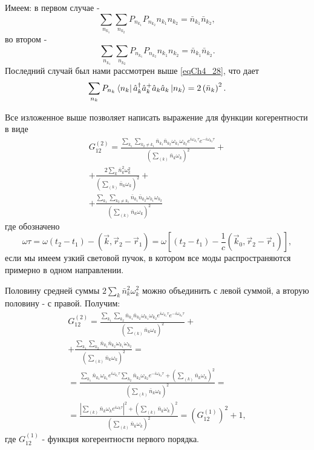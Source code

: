 Имеем: в первом случае -
\begin{equation}
\sum_{n_{k_1}}\sum_{n_{k_2}} P_{n_{k_1}} P_{n_{k_2}} 
n_{k_1} n_{k_2} = \bar{n}_{k_1} \bar{n}_{k_2},
\label{eqCh4_34}
\end{equation}
во втором -
\begin{equation}
\sum_{n_{k_1}}\sum_{n_{k_2}} P_{n_{k_1}} P_{n_{k_2}} 
n_{k_1} n_{k_2} = \bar{n}_{k_1} \bar{n}_{k_2}.
\label{eqCh4_35}
\end{equation}
Последний случай был нами рассмотрен выше \eqref{eqCh4_28}, что дает
\begin{equation}
\sum_{n_{k}} P_{n_{k}}
\bra{n_k}\hat{a}_k^{\dag}\hat{a}_k^{+}\hat{a}_k\hat{a}_k\ket{n_k}
= 2 \left(\bar{n}_k\right)^2.
\label{eqCh4_36}
\end{equation}

Все изложенное выше позволяет написать выражение для функции
когерентности в виде 
\begin{eqnarray}
G_{12}^{(2)} = \frac{\sum_{k_1}\sum_{k_2 \neq k_1} \bar{n}_{k_1}
  \bar{n}_{k_2} \omega_{k_1} \omega_{k_2} e^{i \omega_{k_1} \tau} 
e^{- i \omega_{k_2} \tau} } 
{\left(\sum_{(k)} \bar{n}_k \omega_k\right)^2} + 
\nonumber \\
+
\frac{2 \sum_{k} \bar{n}_{k}^2 \omega_k^2} 
{\left(\sum_{(k)} \bar{n}_k \omega_k\right)^2} + 
\nonumber \\
+
\frac{\sum_{k_1}\sum_{k_2 \neq k_1} \bar{n}_{k_1}
  \bar{n}_{k_2} \omega_{k_1} \omega_{k_2}} 
{\left(\sum_{(k)} \bar{n}_k \omega_k\right)^2}
\label{eqCh4_37}
\end{eqnarray}
где обозначено 
\[
\omega \tau = \omega \left(t_2 - t_1\right) - \left(\vec{k}, \vec{r}_2
- \vec{r}_1\right) = 
\omega \left[
\left(t_2 - t_1\right) - \frac{1}{c}\left(\vec{k}_0, \vec{r}_2
- \vec{r}_1\right)
\right],
\]
если мы имеем узкий световой пучок, в котором все моды
распространяются примерно в одном направлении. 

Половину средней суммы $2 \sum_{k} \bar{n}_{k}^2 \omega_k^2$ можно
объединить с левой суммой, а вторую половину - с правой. Получим: 
\begin{eqnarray}
G_{12}^{(2)} = \frac{\sum_{k_1}\sum_{k_2} \bar{n}_{k_1}
  \bar{n}_{k_2} \omega_{k_1} \omega_{k_2} e^{i \omega_{k_1} \tau} 
e^{- i \omega_{k_2} \tau}} 
{\left(\sum_{(k)} \bar{n}_k \omega_k\right)^2} + 
\nonumber \\
+ \frac{\sum_{k_1}\sum_{k_2} \bar{n}_{k_1}
  \bar{n}_{k_2} \omega_{k_1} \omega_{k_2}} 
{\left(\sum_{(k)} \bar{n}_k \omega_k\right)^2} = 
\nonumber \\
= 
\frac{\sum_{k_1}\bar{n}_{k_1} \omega_{k_1} e^{i \omega_{k_1} \tau}
\sum_{k_2}\bar{n}_{k_2} \omega_{k_2} e^{- i \omega_{k_2} \tau} +
\left(\sum_{(k)} \bar{n}_k \omega_k\right)^2
}
{\left(\sum_{(k)} \bar{n}_k \omega_k\right)^2} = 
\nonumber \\
= \frac{\left|\sum_{(k)}\bar{n}_{k} \omega_{k} e^{i \omega_{k}
  \tau}\right|^2 + \left(\sum_{(k)} \bar{n}_k \omega_k\right)^2}
{\left(\sum_{(k)} \bar{n}_k \omega_k\right)^2} = 
\left(G_{12}^{(1)}\right)^2 + 1,
\label{eqCh4_38}
\end{eqnarray}
где $G_{12}^{(1)}$ - функция когерентности
первого порядка.  

